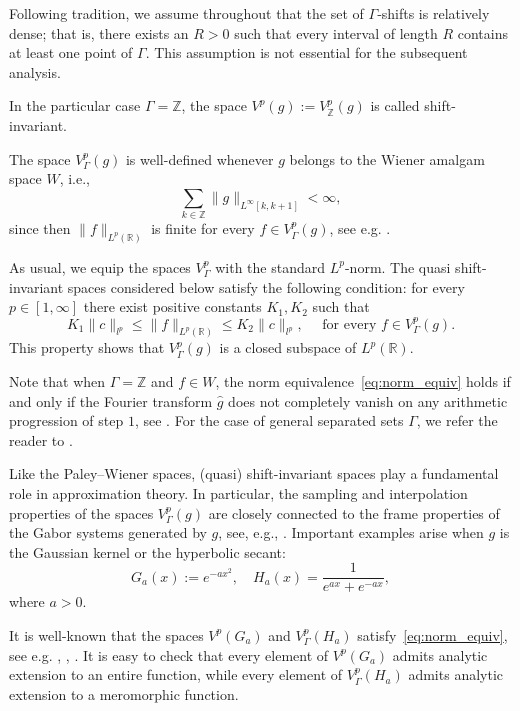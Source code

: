 \documentclass[12pt]{amsart}
\numberwithin{equation}{section}
\theoremstyle{plain}
\theoremstyle{definition}
\newcommand{\R}{{\mathbb R}} \newcommand{\Q}{{\mathbb Q}} \newcommand{\Z}{{\mathbb Z}} \newcommand{\N}{{\mathbb N}}
\begin{document}
Following tradition, we assume throughout that the set of $\Gamma$‑shifts is relatively dense; that is, there exists an $R>0$ such that every interval of length $R$ contains at least one point of $\Gamma$. This assumption is not essential for the subsequent analysis.
 
In the particular case $\Gamma = \Z$, the space $V^p(g):=V^p_{\Z}(g)$ is called shift-invariant.

The space  $V_{\Gamma}^p(g)$ is well-defined whenever $g$ belongs to the Wiener amalgam space $W$, i.e.,
\begin{equation}\label{eq:wiener}
\sum\limits_{k\in\Z} \|g\|_{L^{\infty}[k,k+1]}< \infty,
\end{equation}
since  then $\|f\|_{L^p(\R)}$ is finite for every $f \in V^p_{\Gamma}(g)$, see e.g. \cite[Lemma~8.1]{MR4865221}. 

As usual, we equip the spaces $V^p_{\Gamma}$ with the standard $L^p$-norm.
The quasi shift-invariant spaces considered below satisfy the following condition: 
for every $p \in [1, \infty]$ there exist positive constants $K_1, K_2$ such that
\begin{equation}\label{eq:norm_equiv}
    K_1 \|c\|_{l^p} \le \|f\|_{L^p(\R)} \le K_2 \|c\|_{l^p},\quad \text{ for every $f \in V^p_{\Gamma}(g).$}
\end{equation}
This property shows that  $V^p_{\Gamma}(g)$ is a closed subspace of $L^p(\R)$.

Note that when $\Gamma = \Z$ and $f\in W$, the norm equivalence~\eqref{eq:norm_equiv} holds if and only
if the Fourier transform $\hat{g}$ does not completely vanish on any arithmetic progression of step $1$, 
see \cite{Jia1991}. For the case of general separated sets $\Gamma$, we refer the reader to \cite{MR4950401}. 

Like the Paley--Wiener spaces, (quasi) shift-invariant spaces play a fundamental role in approximation theory. In particular, the sampling and interpolation properties of the spaces $V^p_{\Gamma}(g)$ are closely connected to the frame properties of the Gabor systems generated by $g$, see, e.g., \cite{MR4456797, grs, MR4047939, MR3053565, MR4782146, MR4865221}. Important examples arise when $g$ is the Gaussian kernel or the hyperbolic secant:
\begin{equation}\label{eq:gauss_secant_def}
    G_a(x):= e^{-ax^2}, \quad H_a(x) = \frac{1}{e^{ax}+{e^{-ax}}}, 
\end{equation}
where $a > 0.$

It is well-known that the spaces $V^p(G_a)$ and $V^p_{\Gamma}(H_a)$ satisfy~\eqref{eq:norm_equiv}, see e.g. \cite{MR3053565}, \cite{MR4865221}, \cite{MR4950401}.
It is easy to check that every element of $V^p(G_a)$ admits analytic extension to an entire function, while every element of $V^p_\Gamma(H_a)$ admits analytic extension to a meromorphic function.
\end{document}
